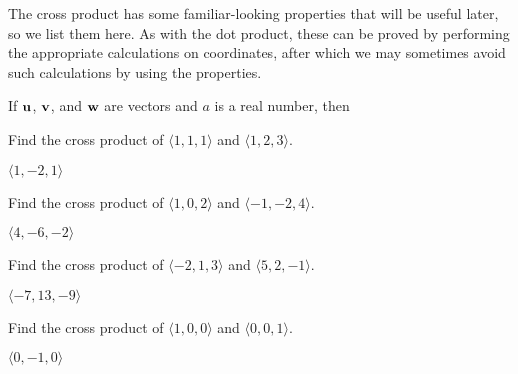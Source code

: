 The cross product has some familiar-looking properties that will be
useful later, so we list them here. As with the dot product, these can
be proved by performing the appropriate calculations on coordinates,
after which we may sometimes avoid such calculations by using the
properties. 

\begin{theorem}
If ${\bf u}$, ${\bf v}$, and ${\bf w}$ are vectors and $a$ is a real
number, then
\label{thm:cross product properties}


\begin{exercises}

\exercise Find the cross product of $\langle 1,1,1\rangle$ and 
$\langle 1,2,3\rangle$. 
\begin{answer} $\langle 1,-2,1\rangle$
\end{answer}

\exercise Find the cross product of $\langle 1,0,2\rangle$ and 
$\langle -1,-2,4\rangle$. 
\begin{answer} $\langle 4,-6,-2\rangle$
\end{answer}

\exercise Find the cross product of $\langle -2,1,3\rangle$ and 
$\langle 5,2,-1\rangle$. 
\begin{answer} $\langle -7,13,-9\rangle$
\end{answer}

\exercise Find the cross product of $\langle 1,0,0\rangle$ and 
$\langle 0,0,1\rangle$. 
\begin{answer}  $\langle 0,-1,0\rangle$
\end{answer}


\end{exercises}
\end{theorem}
